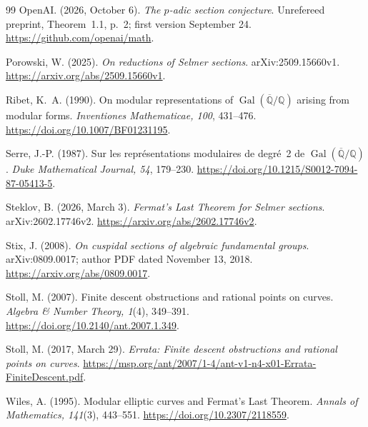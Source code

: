 \documentclass[11pt,a4paper]{article}
\newcommand{\Q}{\mathbb Q}
\DeclareMathOperator{\Gal}{Gal}
\theoremstyle{plain}
\theoremstyle{definition}
\begin{document}
\begin{thebibliography}{99}
OpenAI. (2026, October 6). \emph{The $p$-adic section conjecture}.
Unrefereed preprint, Theorem~1.1, p.~2; first version September 24.
\url{https://github.com/openai/math}.

Porowski, W. (2025). \emph{On reductions of Selmer sections}.
arXiv:2509.15660v1.
\url{https://arxiv.org/abs/2509.15660v1}.

Ribet, K.~A. (1990). On modular representations of
$\Gal(\overline{\Q}/\Q)$ arising from modular forms.
\emph{Inventiones Mathematicae, 100}, 431--476.
\url{https://doi.org/10.1007/BF01231195}.

Serre, J.-P. (1987). Sur les repr\'esentations modulaires de degr\'e~2
de $\Gal(\overline{\Q}/\Q)$.
\emph{Duke Mathematical Journal, 54}, 179--230.
\url{https://doi.org/10.1215/S0012-7094-87-05413-5}.

Steklov, B. (2026, March 3). \emph{Fermat's Last Theorem for Selmer
sections}. arXiv:2602.17746v2.
\url{https://arxiv.org/abs/2602.17746v2}.

Stix, J. (2008). \emph{On cuspidal sections of algebraic fundamental
groups}. arXiv:0809.0017; author PDF dated November 13, 2018.
\url{https://arxiv.org/abs/0809.0017}.

Stoll, M. (2007). Finite descent obstructions and rational points on
curves. \emph{Algebra \& Number Theory, 1}(4), 349--391.
\url{https://doi.org/10.2140/ant.2007.1.349}.

Stoll, M. (2017, March 29). \emph{Errata: Finite descent obstructions
and rational points on curves}.
\url{https://msp.org/ant/2007/1-4/ant-v1-n4-x01-Errata-FiniteDescent.pdf}.

Wiles, A. (1995). Modular elliptic curves and Fermat's Last Theorem.
\emph{Annals of Mathematics, 141}(3), 443--551.
\url{https://doi.org/10.2307/2118559}.
\end{thebibliography}
\end{document}
